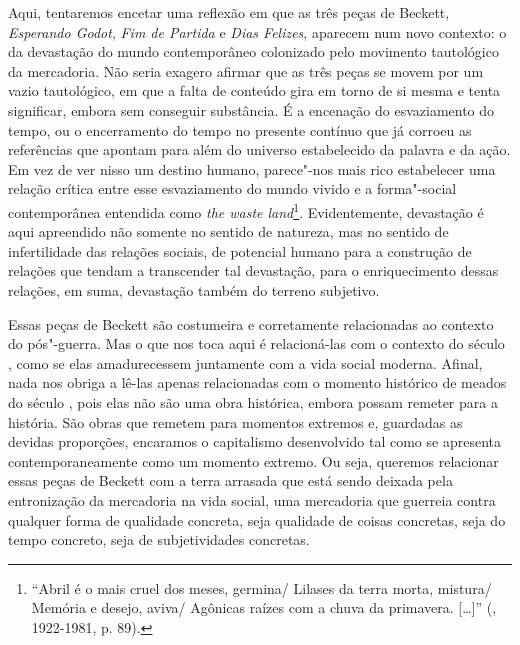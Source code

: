 {Aqui, tentaremos encetar uma reflexão em que as três peças de Beckett,
\emph{Esperando Godot}, \emph{Fim de Partida} e \emph{Dias Felizes},
aparecem num novo contexto: o da devastação do mundo contemporâneo
colonizado pelo movimento tautológico da mercadoria. Não seria exagero
afirmar que as três peças se movem por um vazio tautológico, em que a
falta de conteúdo gira em torno de si mesma e tenta significar, embora
sem conseguir substância. É a encenação do esvaziamento do tempo, ou o
encerramento do tempo no presente contínuo que já corroeu as referências
que apontam para além do universo estabelecido da palavra e da ação. Em
vez de ver nisso um destino humano, parece"-nos mais rico estabelecer uma
relação crítica entre esse esvaziamento do mundo vivido e a forma"-social
contemporânea entendida como \emph{the waste land}\footnote{``Abril é o
  mais cruel dos meses, germina/ Lilases da terra morta, mistura/
  Memória e desejo, aviva/ Agônicas raízes com a chuva da primavera.
  [\ldots{}]'' (, 1922-1981, p. 89).}. Evidentemente,
devastação é aqui apreendido não somente no sentido de natureza, mas no
sentido de infertilidade das relações sociais, de potencial humano para
a construção de relações que tendam a transcender tal devastação, para o
enriquecimento dessas relações, em suma, devastação também do terreno
subjetivo.

Essas peças de Beckett são costumeira e corretamente relacionadas ao
contexto do pós"-guerra. Mas o que nos toca aqui é relacioná-las com o
contexto do século , como se elas amadurecessem juntamente com a vida
social moderna. Afinal, nada nos obriga a lê-las apenas relacionadas com
o momento histórico de meados do século , pois elas não são uma obra
histórica, embora possam remeter para a história. São obras que remetem
para momentos extremos e, guardadas as devidas proporções, encaramos o
capitalismo desenvolvido tal como se apresenta contemporaneamente como
um momento extremo. Ou seja, queremos relacionar essas peças de Beckett
com a terra arrasada que está sendo deixada pela entronização da
mercadoria na vida social, uma mercadoria que guerreia contra qualquer
forma de qualidade concreta, seja qualidade de coisas concretas, seja do
tempo concreto, seja de subjetividades concretas.

}
